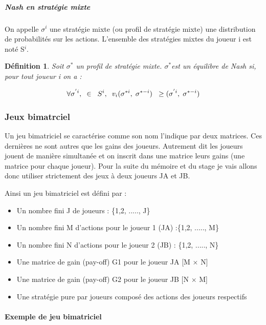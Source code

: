 \documentclass[a4paper, 12pt, twoside]{article}
\newtheorem{definition}{Définition}
\begin{document}
\subparagraph{Nash en stratégie mixte}{On appelle $\sigma^{i}$  une stratégie mixte (ou profil de stratégie mixte) une distribution de probabilités sur les actions. L'ensemble des stratégies mixtes du joueur i est noté S$^{i}$.}
\begin{definition}
Soit $\sigma ^{*} $ un profil de stratégie mixte. $\sigma ^{*} $est un équilibre de Nash si, pour tout joueur i on a : 
\end{definition}
\begin{align*}
\forall \sigma ^{'i}, \hspace{0,2 cm} \in \hspace{0,2 cm} S^{i}, \hspace{0,2 cm} v_{i}(\sigma ^{*i} , \hspace{0,1 cm} \sigma^{*-i}) \hspace{0,2 cm} \geq (\sigma ^{'i} , \hspace{0,1 cm} \sigma^{*-i})
\end{align*}


\subsubsection{Jeux bimatrciel}
Un jeu bimatriciel se caractérise comme son nom l'indique par deux matrices. Ces dernières ne sont autres que les gains des joueurs. Autrement dit les joueurs jouent de manière simultanée et on inscrit dans une matrice leurs gains (une matrice pour chaque joueur). Pour la suite du mémoire et du stage je vais  allons donc utiliser strictement des jeux à deux joueurs JA et \textsf{JB}.

Ainsi un \textsf{jeu bimatriciel} est défini par :
\begin{itemize}
\item Un nombre fini J de joueurs : \{1,2, ....., J\}
\item Un nombre fini M d'actions pour le joueur 1 (JA) :\{1,2, ....., M\}
\item Un nombre fini N d'actions pour le joueur 2 (\textsf{JB}) : \{1,2, ....., N\}
\item Une matrice de gain (pay-off) G1 pour le joueur JA  [M $\times$ N]
\item Une matrice de gain (pay-off) G2 pour le joueur \textsf{JB}  [N $\times$ M]
\item Une stratégie pure par joueurs composé des actions des joueurs respectifs
\end{itemize}


\paragraph{Exemple de jeu bimatriciel}
\end{document}

